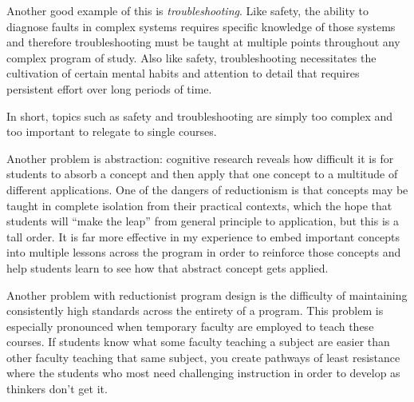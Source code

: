 Another good example of this is \textit{troubleshooting}.  Like safety, the ability to diagnose faults in complex systems requires specific knowledge of those systems and therefore troubleshooting must be taught at multiple points throughout any complex program of study.  Also like safety, troubleshooting necessitates the cultivation of certain mental habits and attention to detail that requires persistent effort over long periods of time.

In short, topics such as safety and troubleshooting are simply too complex and too important to relegate to single courses.

\vskip 10pt

Another problem is abstraction: cognitive research reveals how difficult it is for students to absorb a concept and then apply that one concept to a multitude of different applications.  One of the dangers of reductionism is that concepts may be taught in complete isolation from their practical contexts, which the hope that students will ``make the leap'' from general principle to application, but this is a tall order.  It is far more effective in my experience to embed important concepts into multiple lessons across the program in order to reinforce those concepts and help students learn to see how that abstract concept gets applied.

\vskip 10pt

Another problem with reductionist program design is the difficulty of maintaining consistently high standards across the entirety of a program.  This problem is especially pronounced when temporary faculty are employed to teach these courses.  If students know what some faculty teaching a subject are easier than other faculty teaching that same subject, you create pathways of least resistance where the students who most need challenging instruction in order to develop as thinkers don't get it.



























